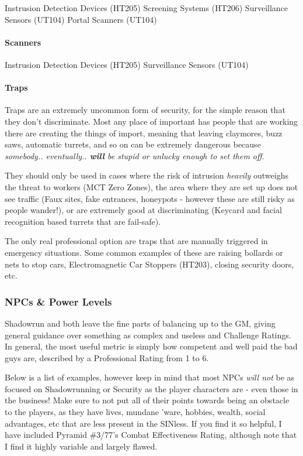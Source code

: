 \begin{multicols}{2}
	Instrusion Detection Devices (HT205)
	Screening Systems (HT206)
	Surveillance Sensors (UT104)
	Portal Scanners (UT104)
	
	\paragraph{Scanners}
	
	Instrusion Detection Devices (HT205)
	Surveillance Sensors (UT104)
	
	
	\paragraph{Traps}
	
	Traps are an extremely uncommon form of security, for the simple reason that they don't discriminate. Most any place of important has people that are working there are creating the things of import, meaning that leaving claymores, buzz saws, automatic turrets, and so on can be extremely dangerous because \textit{somebody.. eventually.. \textbf{will} be stupid or unlucky enough to set them off}.
	
	They should only be used in cases where the risk of intrusion \textit{heavily} outweighs the threat to workers (MCT Zero Zones), the area where they are set up does not see traffic (Faux sites, fake entrances, honeypots - however these are still risky as people wander!), or are extremely good at discriminating (Keycard and facial recognition based turrets that are fail-safe).
	
	The only real professional option are traps that are manually triggered in emergency situations. Some common examples of these are raising bollards or nets to stop cars, Electromagnetic Car Stoppers (HT203), closing security doors, etc.
	
	\subsubsection{NPCs \& Power Levels}
	
	Shadowrun and \GURPS both leave the fine parts of balancing up to the GM, giving general guidance over something as complex and useless and Challenge Ratings. In general, the most useful metric is simply how competent and well paid the bad guys are, described by a Professional Rating from 1 to 6. 
	
	Below is a list of examples, however keep in mind that most NPCs \textit{will not} be as focused on Shadowrunning or Security as the player characters are - even those in the business! Make sure to not put all of their points towards being an obstacle to the players, as they have lives, mundane 'ware, hobbies, wealth, social advantages, etc that are less present in the SINless. If you find it so helpful, I have included Pyramid \#3/77's Combat Effectiveness Rating, although note that I find it highly variable and largely flawed.
	

\end{multicols}
